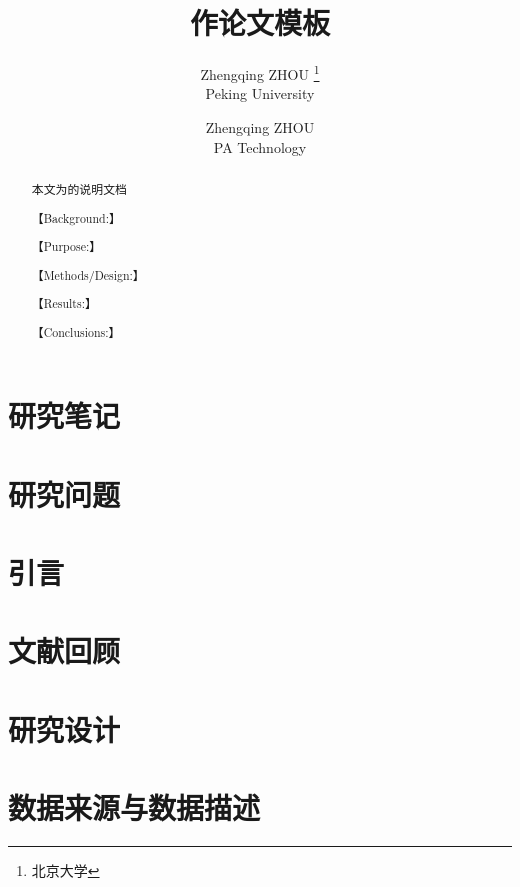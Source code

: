 \documentclass[lang=cn,22pt,a4paper]{elegantpaper}
\title{作论文模板}
\author{Zhengqing ZHOU \thanks{北京大学} \\ Peking University \and Zhengqing ZHOU \\ PA Technology}
\institute{\href{https://pe.pku.edu.cn/}{体育教研部}}
\date{\zhtoday}
\begin{document}
\begin{titlepage}
\clearpage\maketitle
\thispagestyle{empty}

\begin{abstract}
本文为的说明文档
 \par
【Background:】
\par
【Purpose:】
\par
【Methods/Design:】 
\par
【Results:】 
\par
【Conclusions:】

\end{abstract}

\end{titlepage}
    \thispagestyle{empty}
	\newpage
    \tableofcontents
    \setcounter{page}{1}
	\newpage

	\section*{研究笔记} \label{sec:text}
	
	\newpage
	\section{研究问题} \label{sec:research questions}
	
	\newpage
	\section{引言} \label{sec:introduction}
	
	\newpage
	\section{文献回顾} \label{sec:review}
	
	\newpage
	\section{研究设计} \label{sec:design}
	
    \newpage
    \section{数据来源与数据描述}\label{sec:data}
	
    \newpage
\end{document}

